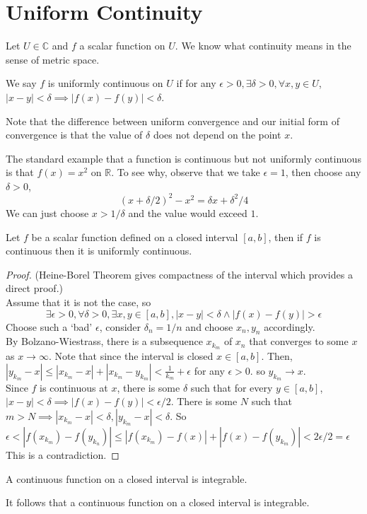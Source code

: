 \section{Uniform Continuity}
Let $U\in\mathbb C$ and $f$ a scalar function on $U$.
We know what continuity means in the sense of metric space.
\begin{definition}
    We say $f$ is uniformly continuous on $U$ if for any $\epsilon>0,\exists\delta>0,\forall x,y\in U$, $|x-y|<\delta\implies |f(x)-f(y)|<\delta$.
\end{definition}
Note that the difference between uniform convergence and our initial form of convergence is that the value of $\delta$ does not depend on the point $x$.
\begin{example}
    The standard example that a function is continuous but not uniformly continuous is that $f(x)=x^2$ on $\mathbb R$.
    To see why, observe that we take $\epsilon=1$, then choose any $\delta>0$,
    $$(x+\delta/2)^2-x^2=\delta x+\delta^2/4$$
    We can just choose $x>1/\delta$ and the value would exceed $1$.
\end{example}
\begin{theorem}
    Let $f$ be a scalar function defined on a closed interval $[a,b]$, then if $f$ is continuous then it is uniformly continuous.
\end{theorem}
\begin{proof}
    (Heine-Borel Theorem gives compactness of the interval which provides a direct proof.)\\
    Assume that it is not the case, so
    $$\exists\epsilon>0,\forall\delta>0,\exists x,y\in[a,b], |x-y|<\delta\land |f(x)-f(y)|>\epsilon$$
    Choose such a `bad' $\epsilon$, consider $\delta_n=1/n$ and choose $x_n,y_n$ accordingly.\\
    By Bolzano-Wiestrass, there is a subsequence $x_{k_m}$ of $x_n$ that converges to some $x$ as $x\to\infty$.
    Note that since the interval is closed $x\in[a,b]$.
    Then, $|y_{k_m}-x|\le |x_{k_m}-x|+|x_{k_m}-y_{k_m}|<\frac{1}{k_m}+\epsilon$
    for any $\epsilon>0$. so $y_{k_m}\to x$.\\
    Since $f$ is continuous at $x$, there is some $\delta$ such that for every $y\in[a,b]$, $|x-y|<\delta\implies |f(x)-f(y)|<\epsilon/2$.
    There is some $N$ such that $m>N\implies |x_{k_m}-x|<\delta,|y_{k_m}-x|<\delta$.
    So $\epsilon<|f(x_{k_m})-f(y_{k_n})|\le |f(x_{k_m})-f(x)|+|f(x)-f(y_{k_m})|<2\epsilon/2=\epsilon$
    This is a contradiction.
\end{proof}
\begin{corollary}
    A continuous function on a closed interval is integrable.
\end{corollary}
It follows that a continuous function on a closed interval is integrable.
